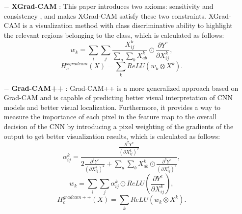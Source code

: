 \documentclass[journal,twoside]{IEEEtran}
\begin{document}
\begin{itemize}

\item [$\bm{-}$]
\textbf{XGrad-CAM }\cite{fu2020axiom}: This paper introduces two axioms: sensitivity \cite{sundararajan2017axiomatic} and consistency \cite{montavon2018methods}, and makes XGrad-CAM satisfy these two constraints. XGrad-CAM is a visualization method with class discriminative ability to highlight the relevant regions belonging to the class, which is calculated as follows:
\begin{equation}
    w_k=\sum_i\sum_j \frac{X^{k}_{ij}}{\sum_a\sum_b X^{k}_{ab}}\odot \frac{\partial Y^c}{\partial X^{k}_{ij}}, \label{eq:no24}
\end{equation}
\begin{equation}
    H^{xgradcam}_{c}(X)=\sum_k ReLU(w_k \otimes X^k). \label{eq:no25}
\end{equation}

\item [$\bm{-}$]
\textbf{Grad-CAM++ }\cite{chattopadhay2018grad}: Grad-CAM++ is a more generalized approach based on Grad-CAM and is capable of predicting better visual interpretation of CNN models and better visual localization. Furthermore, it provides a way to measure the importance of each pixel in the feature map to the overall decision of the CNN by introducing a pixel weighting of the gradients of the output to get better visualization results, which is calculated as follows:
\begin{equation}
   \alpha^{k}_{ij}=\frac{\frac{\partial^2Y^c}{(\partial X^{k}_{ij})^2}}{2 \frac{\partial^2Y^c}{(\partial X^{k}_{ij})^2}+\sum_a \sum_b X^{k}_{ab} \odot \frac{\partial^3Y^c}{(\partial X^{k}_{ij})^3}},   \label{eq:no26}
\end{equation}
\begin{equation}
    w_k=\sum_i\sum_j \alpha^{k}_{ij} \odot ReLU(\frac{\partial Y^c}{\partial X^{k}_{ij}}), \label{eq:no27}
\end{equation}
\begin{equation}
    H^{gradcam++}_{c}(X)=\sum_{k}ReLU(w_k \otimes X^{k}).
\end{equation}

\end{itemize}
\end{document}
